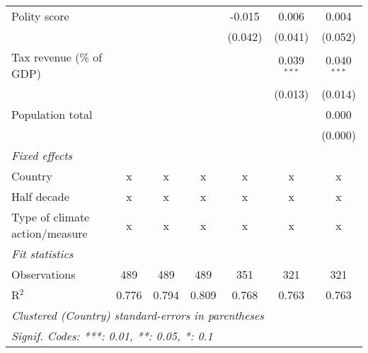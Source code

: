 \begin{tabular}{lcccccc}
   Polity score                                                          &         &                &                & -0.015         & 0.006          & 0.004\\   
                                                                         &         &                &                & (0.042)        & (0.041)        & (0.052)\\   
   Tax revenue (\% of GDP)                                               &         &                &                &                & 0.039$^{***}$  & 0.040$^{***}$\\   
                                                                         &         &                &                &                & (0.013)        & (0.014)\\   
   Population total                                                      &         &                &                &                &                & 0.000\\   
                                                                         &         &                &                &                &                & (0.000)\\   
   \emph{Fixed effects}\\
   Country                                                               & x       & x              & x              & x              & x              & x\\  
   Half decade                                                           & x       & x              & x              & x              & x              & x\\  
   Type of climate action/measure                                        & x       & x              & x              & x              & x              & x\\  
   \midrule \emph{Fit statistics}\\
   Observations                                                          & 489     & 489            & 489            & 351            & 321            & 321\\  
   R$^2$                                                                 & 0.776   & 0.794          & 0.809          & 0.768          & 0.763          & 0.763\\  
   \midrule
   \multicolumn{7}{l}{\emph{Clustered (Country) standard-errors in parentheses}}\\
   \multicolumn{7}{l}{\emph{Signif. Codes: ***: 0.01, **: 0.05, *: 0.1}}\\
\end{tabular}
\par\endgroup


